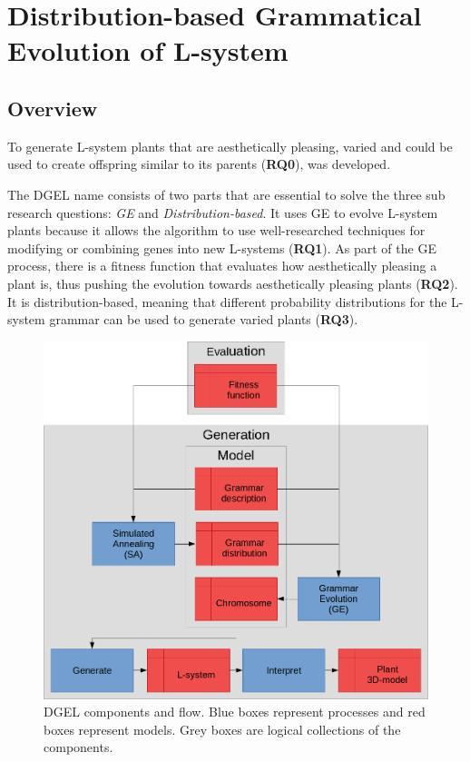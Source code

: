 \chapter{Distribution-based Grammatical Evolution of L-system}
\label{chap:dgel}

\section{Overview}
\label{sec:overview}
To generate \gls{L-system} plants that are aesthetically pleasing, varied and could be used to create offspring similar to its parents (\textbf{RQ0}),  was developed.

The \gls{DGEL} name consists of two parts that are essential to solve the three sub research questions: \textit{\gls{GE}} and \textit{Distribution-based}.
It uses \gls{GE} to evolve \gls{L-system} plants because it allows the algorithm to use well-researched techniques for modifying or combining genes into new \glspl{L-system} (\textbf{RQ1}).
As part of the \gls{GE} process, there is a fitness function that evaluates how aesthetically pleasing a plant is, thus pushing the evolution towards aesthetically pleasing plants (\textbf{RQ2}).
It is distribution-based, meaning that different probability distributions for the \gls{L-system} grammar can be used to generate varied plants (\textbf{RQ3}).

\begin{figure}
    \centering
    \includegraphics[width=1.0\textwidth]{figures/dgel}
    \caption[DGEL components and flow]{\gls{DGEL} components and flow. Blue boxes represent processes and red boxes represent models. Grey boxes are logical collections of the components.}
    \label{fig:dgel}
\end{figure}

